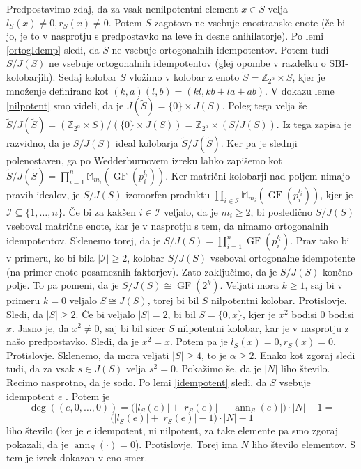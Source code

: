 \documentclass[a4paper, 12pt]{amsart}
\theoremstyle{definition} %
\theoremstyle{plain} %
\newcommand{\Z}{\mathbb Z}
\newcommand{\M}{\mathbb M}
\DeclareMathOperator{\ann}{ann}
\DeclareMathOperator{\GF}{GF}
\begin{document}
Predpostavimo zdaj, da za vsak nenilpotentni element $x \in S$ velja $l_S(x) \neq 0, r_S(x) \neq 0$. Potem $S$ zagotovo ne vsebuje enostranske enote (če bi jo, je to v nasprotju s predpostavko na leve in desne anihilatorje). Po lemi \ref{ortogIdemp} sledi, da $S$ ne vsebuje ortogonalnih idempotentov. Potem tudi $S/J(S)$ ne vsebuje ortogonalnih idempotentov (glej opombe v razdelku o SBI-kolobarjih). Sedaj kolobar $S$ vložimo v kolobar z enoto $\tilde{S} = \Z_{2^{\alpha}}\times S$, kjer je množenje definirano kot $(k,a)(l,b) = (kl,kb+la+ab)$. V dokazu leme \ref{nilpotent} smo videli, da je $J(\tilde{S}) = \{0\}\times J(S)$. Poleg tega velja še $\tilde{S} / J( \tilde{S}) = (\Z_{2^{\alpha}}\times S)/( \{0\}\times J(S)) = \Z_{2^{\alpha}} \times (S/J(S))$. Iz tega zapisa je razvidno, da je $S/J(S)$ ideal kolobarja $\tilde{S}/J(\tilde{S})$. Ker pa je slednji polenostaven, ga po Wedderburnovem izreku lahko zapišemo kot $\tilde{S}/J(\tilde{S}) = \prod_{i=1}^n \M_{m_i}(\GF(p_i^{l_i}))$. Ker matrični kolobarji nad poljem nimajo pravih idealov, je $S/J(S)$ izomorfen produktu $\prod_{i\in \mathcal{I}} \M_{m_i}(\GF(p_i^{l_i}))$, kjer je $\mathcal{I} \subseteq \{1,\dots,n\}$. Če bi za kakšen $i\in \mathcal{I}$ veljalo, da je $m_i\ge 2$, bi posledično $S/J(S)$ vseboval matrične enote, kar je v nasprotju s tem, da nimamo ortogonalnih idempotentov. Sklenemo torej, da je $S/J(S) = \prod_{i=1}^n \GF(p_i^{l_i})$. Prav tako bi v  primeru, ko bi bila $|\mathcal{I}| \ge 2$, kolobar $S/J(S)$ vseboval ortogonalne idempotente (na primer enote posameznih faktorjev). Zato zaključimo, da je $S/J(S)$  končno polje. To pa pomeni, da je $S/J(S) \cong \GF(2^k)$. Veljati mora $k\ge 1$, saj bi v primeru $k=0$ veljalo $S \cong J(S)$, torej bi bil $S$ nilpotentni kolobar. Protislovje. Sledi, da $|S| \ge 2$. Če bi veljalo $|S| = 2$, bi bil $S=\{0,x\}$, kjer je $x^2$ bodisi $0$ bodisi $x$. Jasno je, da $x^2 \neq 0$, saj bi bil sicer $S$ nilpotentni kolobar, kar je v nasprotju z našo predpostavko. Sledi, da je $x^2 = x$. Potem pa je $l_S(x) = 0, r_S(x) = 0$. Protislovje. Sklenemo, da mora veljati $|S| \ge 4$, to je $\alpha \ge 2$. Enako kot zgoraj sledi tudi, da za vsak $ s \in J(S)$ velja $s^2 = 0$. Pokažimo še, da je $|N| $ liho število. Recimo nasprotno, da je sodo. Po lemi \ref{idempotent} sledi, da $S$ vsebuje idempotent $e$ . Potem je 
$$
\deg((e,0,\dots,0)) = \big(|l_S(e)| + |r_S(e)| - |\ann_S(e)| \big)\cdot |N| -1 =
$$
$$
 \big(|l_S(e)| + |r_S(e)| - 1 \big)\cdot |N| -1
$$
liho število (ker je $e$ idempotent, ni nilpotent, za take elemente pa smo zgoraj pokazali, da je $\ann_S(\cdot) = 0$). Protislovje. Torej ima $N$ liho število elementov. S tem je izrek dokazan v eno smer.
\end{document}
